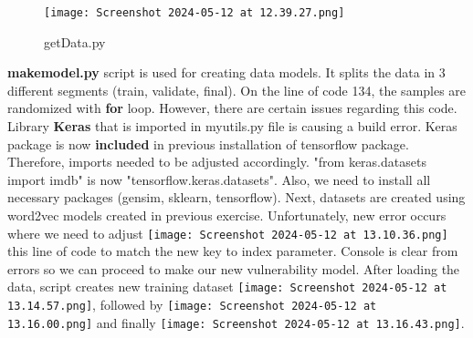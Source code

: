     \begin{figure}
            \centering
            \texttt{[image: Screenshot 2024-05-12 at 12.39.27.png]}
            \caption{getData.py}
            \label{fig:enter-label}
        \end{figure}
                

   \textbf{makemodel.py} script is used for creating data models. It splits the data in 3 different segments (train, validate, final).
   On the line of code 134, the samples are randomized with \textbf{for} loop. However, there are certain issues regarding this code. Library \textbf{Keras} that is imported in myutils.py file is causing a build error. Keras package is now \textbf{included} in previous installation of tensorflow package. Therefore, imports needed to be adjusted accordingly. "from keras.datasets import imdb" is now "tensorflow.keras.datasets". Also, we need to install all necessary packages (gensim, sklearn, tensorflow). Next, datasets are created using word2vec models created in previous exercise. Unfortunately, new error occurs where we need to adjust \texttt{[image: Screenshot 2024-05-12 at 13.10.36.png]} this line of code to match the new key to index parameter. Console is clear from errors so we can proceed to make our new vulnerability model. After loading the data, script creates new training dataset \texttt{[image: Screenshot 2024-05-12 at 13.14.57.png]}, followed by \texttt{[image: Screenshot 2024-05-12 at 13.16.00.png]} and finally \texttt{[image: Screenshot 2024-05-12 at 13.16.43.png]}.
                  


   
   